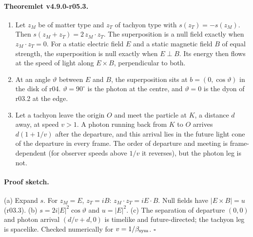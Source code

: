 \paragraph{Theoremlet v4.9.0-r05.3.}
\begin{enumerate}[leftmargin=2em]
\item[(a)] Let \(z_M\) be of matter type and \(z_T\) of tachyon type with \(s(z_T)=-s(z_M)\).  Then
\(s(z_M+z_T)=2\,z_M\cdot z_T\).  The superposition is a null field exactly when \(z_M\cdot z_T=0\).  For a static electric
field \(E\) and a static magnetic field \(B\) of equal strength, the superposition is null exactly when \(E\perp B\).  Its
energy then flows at the speed of light along \(E\times B\), perpendicular to both.
\item[(b)] At an angle \(\vartheta\) between \(E\) and \(B\), the superposition sits at \(b=(0,\cos\vartheta)\) in the disk of
r04.  \(\vartheta=90^\circ\) is the photon at the centre, and \(\vartheta=0\) is the dyon of r03.2 at the edge.
\item[(c)] Let a tachyon leave the origin \(O\) and meet the particle at \(K\), a distance \(d\) away, at speed \(v>1\).  A
photon running back from \(K\) to \(O\) arrives \(d(1+1/v)\) after the departure, and this arrival lies in the future light
cone of the departure in every frame.  The order of departure and meeting is frame-dependent (for observer speeds above
\(1/v\) it reverses), but the photon leg is not.
\end{enumerate}

\paragraph{Proof sketch.}
(a) Expand \(s\).  For \(z_M=E\), \(z_T=iB\): \(z_M\cdot z_T=iE\cdot B\).  Null fields have \(|E\times B|=u\) (r03.3).
(b) \(s=2i|E|^2\cos\vartheta\) and \(u=|E|^2\).  (c) The separation of departure \((0,0)\) and photon arrival
\((d/v+d,0)\) is timelike and future-directed; the tachyon leg is spacelike.  Checked numerically for \(v=1/\beta_{\mathrm{sym}}\).
\(\square\)

